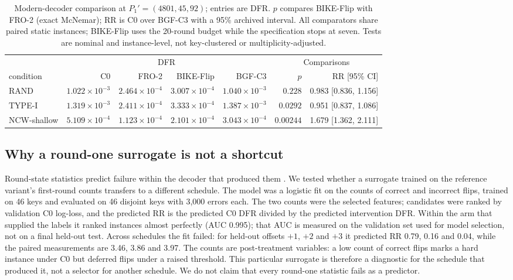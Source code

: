 \documentclass[lettersize,journal,onecolumn]{IEEEtran}
\begin{document}
\begin{table}[!t]
\centering
\small
\caption{Modern-decoder comparison at $P_1'=(4801,45,92)$; entries are DFR. $p$ compares BIKE-Flip with FRO-2 (exact McNemar); RR is C0 over BGF-C3 with a 95\% archived interval. All comparators share paired static instances; BIKE-Flip uses the 20-round budget while the specification stops at seven. Tests are nominal and instance-level, not key-clustered or multiplicity-adjusted.}
\label{tab:modern}
\begin{tabular}{lrrrrrr}
\toprule
 & \multicolumn{4}{c}{DFR} & \multicolumn{2}{c}{Comparisons} \\
\cmidrule(lr){2-5} \cmidrule(lr){6-7}
condition & C0 & FRO-2 & BIKE-Flip & BGF-C3 & $p$ & RR [95\% CI] \\
\midrule
RAND & $1.022\times10^{-3}$ & $2.464\times10^{-4}$ & $3.007\times10^{-4}$ & $1.040\times10^{-3}$ & $0.228$ & 0.983 [0.836, 1.156] \\
TYPE-I & $1.319\times10^{-3}$ & $2.411\times10^{-4}$ & $3.333\times10^{-4}$ & $1.387\times10^{-3}$ & $0.0292$ & 0.951 [0.837, 1.086] \\
NCW-shallow & $5.109\times10^{-4}$ & $1.123\times10^{-4}$ & $2.101\times10^{-4}$ & $3.043\times10^{-4}$ & $0.00244$ & 1.679 [1.362, 2.111] \\
\bottomrule
\end{tabular}
\end{table}
\subsection{Why a round-one surrogate is not a shortcut}\label{sec:counterfactual}

Round-state statistics predict failure within the decoder that produced them \cite{kim2021logistic,paiva2022pickyfix}. We tested whether a surrogate trained on the reference variant's first-round counts transfers to a different schedule. The model was a logistic fit on the counts of correct and incorrect flips, trained on 46 keys and evaluated on 46 disjoint keys with 3,000 errors each. The two counts were the selected features; candidates were ranked by validation C0 log-loss, and the predicted RR is the predicted C0 DFR divided by the predicted intervention DFR. Within the arm that supplied the labels it ranked instances almost perfectly (AUC 0.995); that AUC is measured on the validation set used for model selection, not on a final held-out test. Across schedules the fit failed: for held-out offsets $+1$, $+2$ and $+3$ it predicted RR 0.79, 0.16 and 0.04, while the paired measurements are 3.46, 3.86 and 3.97. The counts are post-treatment variables: a low count of correct flips marks a hard instance under C0 but deferred flips under a raised threshold. This particular surrogate is therefore a diagnostic for the schedule that produced it, not a selector for another schedule. We do not claim that every round-one statistic fails as a predictor.
\end{document}
